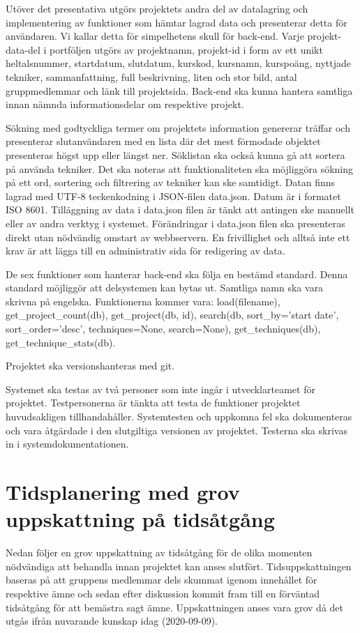 \documentclass{TDP003mall}
\begin{document}
Utöver det presentativa utgörs projektets andra del av datalagring och implementering av funktioner som hämtar lagrad data och presenterar detta för användaren. Vi kallar detta för simpelhetens skull för back-end. Varje projekt-data-del i portföljen utgörs av projektnamn, projekt-id i form av ett unikt heltalsnummer, startdatum, slutdatum, kurskod, kursnamn, kurspoäng, nyttjade tekniker, sammanfattning, full beskrivning, liten och stor bild, antal gruppmedlemmar och länk till projektsida. Back-end ska kunna hantera samtliga innan nämnda informationsdelar om respektive projekt.

Sökning med godtyckliga termer om projektets information genererar träffar och presenterar slutanvändaren med en lista där det mest förmodade objektet presenteras högst upp eller längst ner. Söklistan ska också kunna gå att sortera på använda tekniker. Det ska noteras att funktionaliteten ska möjliggöra sökning på ett ord, sortering och filtrering av tekniker kan ske samtidigt. Datan finns lagrad med UTF-8 teckenkodning i JSON-filen data.json. Datum är i formatet ISO 8601. Tilläggning av data i data.json filen är tänkt att antingen ske manuellt eller av andra verktyg i systemet. Förändringar i data.json filen ska presenteras direkt utan nödvändig omstart av webbservern. En frivillighet och alltså inte ett krav är att lägga till en administrativ sida för redigering av data.

De sex funktioner som hanterar back-end ska följa en bestämd standard. Denna standard möjliggör att delsystemen kan bytas ut. Samtliga namn ska vara skrivna på engelska. Funktionerna kommer vara: load(filename), get\_project\_count(db), get\_project(db, id), search(db, sort\_by='start date', sort\_order='desc', techniques=None, search=None), get\_techniques(db), get\_technique\_stats(db).

Projektet ska versionshanteras med git.

Systemet ska testas av två personer som inte ingår i utvecklarteamet för projektet. Testpersonerna är tänkta att testa de funktioner projektet huvudsakligen tillhandahåller. Systemtesten och uppkomna fel ska dokumenteras och vara åtgärdade i den slutgiltiga versionen av projektet. Testerna ska skrivas in i systemdokumentationen.


\section{Tidsplanering med grov uppskattning på tidsåtgång}
Nedan följer en grov uppskattning av tidsåtgång för de olika momenten nödvändiga att behandla innan projektet kan anses slutfört. Tidsuppskattningen baseras på att gruppens medlemmar dels skummat igenom innehållet för respektive ämne och sedan efter diskussion kommit fram till en förväntad tidsåtgång för att bemästra sagt ämne. Uppskattningen anses vara grov då det utgås ifrån nuvarande kunskap idag (2020-09-09).
\end{document}
